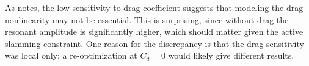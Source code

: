 \ifdefined\DISSERTATION
    As  notes, the low sensitivity to drag coefficient suggests that modeling the drag nonlinearity may not be essential.
    This is surprising, since without drag the resonant amplitude is significantly higher, which should matter given the active slamming constraint.
    One reason for the discrepancy is that the drag sensitivity was local only; a re-optimization at $C_d=0$ would likely give different results.
\else
\fi








